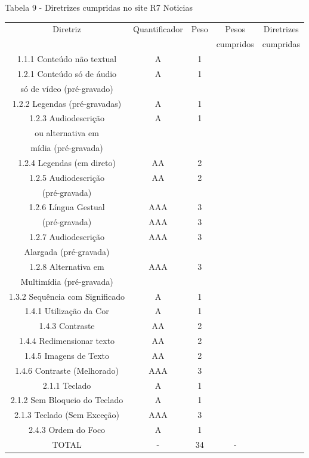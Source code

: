 \documentclass[a4paper]{article}
\begin{document}
\begin{titlepage}
Tabela 9 - Diretrizes cumpridas no site R7 Noticias\\[-1cm]
\begin{center}
	\fontsize{8pt}{8pt}\selectfont	
	\begin{longtable}{|c|c|c|c|c|}
		\hline
		Diretriz & Quantificador & Peso & Pesos & Diretrizes\\
		& & & cumpridos & cumpridas\\
		\hline
		1.1.1 Conteúdo não textual & A & 1 & & \\
		\hline
		1.2.1 Conteúdo só de áudio & A & 1 & & \\
		só de vídeo (pré-gravado) & & & & \\
		\hline
		1.2.2 Legendas (pré-gravadas) & A & 1 & & \\
		\hline
		1.2.3 Audiodescrição & A & 1 & & \\
		ou alternativa em & & & & \\
		mídia (pré-gravada) & & & & \\
		\hline
		1.2.4 Legendas (em direto) & AA & 2 & & \\
		\hline
		1.2.5 Audiodescrição & AA & 2 & & \\
		(pré-gravada) & & & & \\
		\hline
		1.2.6 Língua Gestual & AAA & 3 & & \\
		(pré-gravada) & AAA & 3 & & \\
		\hline
		1.2.7 Audiodescrição & AAA & 3 & & \\
		Alargada (pré-gravada) & & & & \\
		\hline
		1.2.8 Alternativa em & AAA & 3 & & \\
		Multimídia (pré-gravada) & & & & \\
		\hline
		1.3.2 Sequência com Significado & A & 1 & & \\
		\hline
		1.4.1 Utilização da Cor & A & 1 & & \\
		\hline
		1.4.3 Contraste & AA & 2 & & \\
		\hline
		1.4.4 Redimensionar texto & AA & 2 & & \\
		\hline
		1.4.5 Imagens de Texto & AA & 2 & & \\
		\hline
		1.4.6 Contraste (Melhorado) & AAA & 3 & & \\
		\hline
		2.1.1 Teclado & A & 1 & & \\
		\hline
		2.1.2 Sem Bloqueio do Teclado & A & 1 & & \\
		\hline
		2.1.3 Teclado (Sem Exceção) & AAA & 3 & & \\
		\hline
		2.4.3 Ordem do Foco & A & 1 & & \\
		\hline
		TOTAL & - & 34 & - & \\
		\hline
	\end{longtable}
\end{center}


\end{titlepage}
\end{document}
